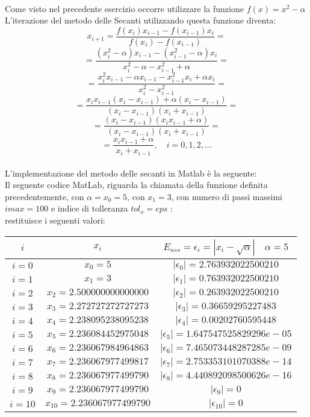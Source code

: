 \large\noindent{}\\

Come visto nel precedente esercizio occorre utilizzare la funzione $f(x) = x^2 - \alpha$\\
L'iterazione del metodo delle Secanti utilizzando questa funzione diventa:
	\[
	x_{i+1} = \frac{f(x_i)x_{i-1}-f(x_{i-1})x_i}{f(x_i)-f(x_{i-1})} =
	\]
	\[
	= \frac{(x_i^2-\alpha)x_{i-1}-(x_{i-1}^2-\alpha)x_i}{x_i^2-\alpha-x_{i-1}^2+\alpha}  =
	\]
	\[
	= \frac{x_i^2x_{i-1}-\alpha x_{i-1}-x_{i-1}^2x_i+\alpha x_i}{x_i^2-x_{i-1}^2} =
	\]
	\[
	= \frac{x_ix_{i-1}(x_i-x_{i-1})+\alpha (x_i-x_{i-1})}{(x_i-x_{i-1})(x_i+x_{i-1})} =
	\]
	\[
	= \frac{(x_i-x_{i-1})(x_ix_{i-1}+\alpha)}{(x_i-x_{i-1})(x_i+x_{i-1})} =
	\]
	\[
	= \frac{x_ix_{i-1}+\alpha}{x_i+x_{i-1}},\quad i=0,1,2,...
	\]\\
L'implementazione del metodo delle secanti in Matlab è la seguente:\\ 
	
Il seguente codice MatLab, riguarda la chiamata della funzione definita precedentemente, con $\alpha=x_0=5$, con $x_1=3$, con numero di passi massimi $imax=100$ e indice di tolleranza $tol_x=eps$ :\\
	
restituisce i seguenti valori:\\
\begin{center}
	\begin{tabular}{|c|c|c|}
		\hline
			$i$ & $x_i$ & $E_{ass}=\epsilon_i=|x_i-\sqrt{\alpha}| \quad \alpha=5$ \\
		\hline
    		$i=0$ & $x_0 = 5$ & $|\epsilon_0| = 2.763932022500210$\\
    		$i=1$ & $x_1 = 3$ & $|\epsilon_1| = 0.763932022500210$\\
    		$i=2$ & $x_2 = 2.500000000000000$ & $|\epsilon_2| = 0.263932022500210$\\
    		$i=3$ & $x_3 = 2.272727272727273$ & $|\epsilon_3| = 0.36659295227483$\\
    		$i=4$ & $x_4 = 2.238095238095238$ & $|\epsilon_4| = 0.00202760595448$\\
    		$i=5$ & $x_5 = 2.236084452975048$ & $|\epsilon_5| = 1.647547525829296e-05$\\
    		$i=6$ & $x_6 = 2.236067984964863$ & $|\epsilon_6| = 7.465073448287285e-09$\\
    		$i=7$ & $x_7 = 2.236067977499817$ & $|\epsilon_7| = 2.753353101070388e-14$\\
    		$i=8$ & $x_8 = 2.236067977499790$ & $|\epsilon_8| = 4.440892098500626e-16$\\
    		$i=9$ & $x_9 = 2.236067977499790$ & $|\epsilon_9| = 0$\\
    		$i=10$ & $x_{10} = 2.236067977499790$ & $|\epsilon_{10}| = 0$\\
		\hline
	\end{tabular}
\end{center}